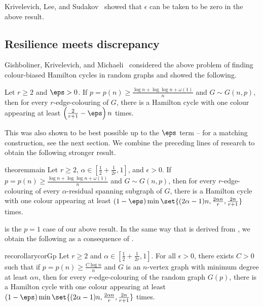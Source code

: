 \documentclass[10pt,a4paper,reqno]{amsart}
\begin{document}
Krivelevich, Lee, and Sudakov~\cite{Krivelevich2014robust} showed that $\epsilon$ can be taken to be zero in the above result.



\subsection{Resilience meets discrepancy}
Gishboliner, Krivelevich, and Michaeli~\cite{Gishboliner2021colourbiased} considered the above problem of finding colour-biased Hamilton cycles in random graphs and showed the following. 

\begin{theorem} \label{thm:colour biased Ham cycle in random graph}
    Let $r\ge 2$ and $\eps >0$. 
    If $p =  p(n) \ge \frac{\log{n} + \log\log{n} + \omega(1)}{n}$ and $G \sim G(n,p)$, then \whp for every $r$-edge-colouring of $G$, there is a Hamilton cycle with one colour appearing at least $\left(\frac{2}{r+1} - \eps\right)n$ times. 
\end{theorem} 
This was also shown to be best possible up to the $\eps$ term -- for a matching construction, see the next section. We combine the preceding lines of research to obtain the following stronger result. 
\begin{restatable}{theorem}{main} \label{thm:main}
    Let $r\ge 2$, $\alpha\in [\frac{1}{2} + \frac{1}{2r}, 1]$, and $\epsilon >0$. If $p =  p(n) \ge \frac{\log{n} + \log\log{n} + \omega(1)}{n}$ and $G \sim G(n,p)$, then \whp for every $r$-edge-colouring of every $\alpha$-residual spanning subgraph of $G$, there is a Hamilton cycle with one colour appearing at least $(1-\eps) \min\set{(2\alpha - 1)n, \frac{2\alpha n}{r}, \frac{2n}{r+1}}$ times. 
\end{restatable} 

 is the $p=1$ case of our above result. 
In the same way that  is derived from , we obtain the following as a consequence of . 

\begin{restatable}{recorollary}{corGp}
  \label{cor:G(p)}
  Let $r\ge 2$ and $\alpha\in [\frac{1}{2} + \frac{1}{2r}, 1]$. 
    For all $\epsilon >0$, there exists $C >0$ such that if $p =  p(n) \ge \frac{C\log{n}}{n}$ and $G$ is an $n$-vertex graph with minimum degree at least $\alpha n$, then \whp for every $r$-edge-colouring of the random graph $G(p)$, there is a Hamilton cycle with one colour appearing at least $(1-\eps) \min\set{(2\alpha - 1)n, \frac{2\alpha n}{r}, \frac{2n}{r+1}}$ times. 
\end{restatable}
\end{document}
